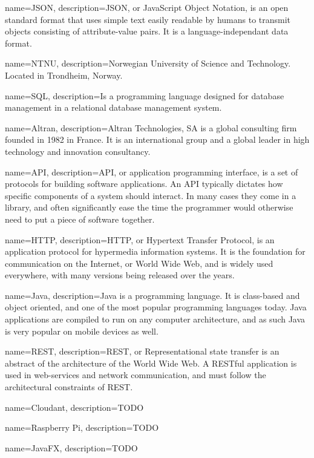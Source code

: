 \documentclass[../document]{subfiles}
\begin{document}
 {
   name=JSON,
   description={JSON, or JavaScript Object Notation, is an open standard format that uses simple text easily readable by humans to transmit objects consisting of attribute-value pairs. It is a language-independant data format.}
}

{
   name=NTNU,
   description={Norwegian University of Science and Technology. Located in Trondheim, Norway.}
}

{
   name=SQL,
   description={Is a programming language designed for database management in a relational database management system.}
}

{
   name=Altran,
   description={Altran Technologies, SA is a global consulting firm founded in 1982 in France. It is an international group and a global leader in high technology and innovation consultancy.}
}

{
   name=API,
   description={API, or application programming interface, is a set of protocols for building software applications. An API typically dictates how specific components of a system should interact. In many cases they come in a library, and often significantly ease the time the programmer would otherwise need to put a piece of software together.}
}

{
   name=HTTP,
   description={HTTP, or Hypertext Transfer Protocol, is an application protocol for hypermedia information systems. It is the foundation for communication on the Internet, or World Wide Web, and is widely used everywhere, with many versions being released over the years.}
}

{
   name=Java,
   description={Java is a programming language. It is class-based and object oriented, and one of the most popular programming languages today. Java applications are compiled to run on any computer architecture, and as such Java is very popular on mobile devices as well. }
}


{
   name=REST,
   description={REST, or Representational state transfer is an abstract of the architecture of the World Wide Web. A RESTful application is used in web-services and network communication, and must follow the architectural constraints of REST.}
}

{
   name=Cloudant,
   description={TODO}
}

{
   name=Raspberry Pi,
   description={TODO}
}

{
   name=JavaFX,
   description={TODO}
}
\end{document}
